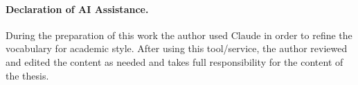 \paragraph{Declaration of AI Assistance.} During the preparation of this work the author used Claude in order to refine the vocabulary for academic style. After using this tool/service, the author reviewed and edited the content as needed and takes full responsibility for the content of the thesis.
